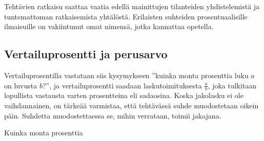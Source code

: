Tehtävien ratkaisu saattaa vaatia edellä mainittujen tilanteiden yhdistelemistä ja tuntemattoman ratkaisemista yhtälöstä. Erilaisten suhteiden prosentuaalisille ilmaisuille on vakiintunut omat nimensä, jotka kannattaa opetella.

\subsection{Vertailuprosentti ja perusarvo}


Vertailuprosentilla vastataan siis kysymykseen ''kuinka monta prosenttia luku $a$ on luvusta $b$?'', ja vertailuprosentti saadaan laskutoimituksesta $\frac{a}{b}$, joka tulkitaan lopullista vastausta varten prosentteina eli sadaosina. Koska jakolasku ei ole vaihdannainen, on tärkeää varmistaa, että tehtävässä suhde muodostetaan oikein päin. Suhdetta muodostettaessa se, mihin verrataan, toimii jakajana.

\begin{esimerkki}
Kuinka monta prosenttia
	\begin{esimratk}
	\end{esimratk}
\end{esimerkki}


